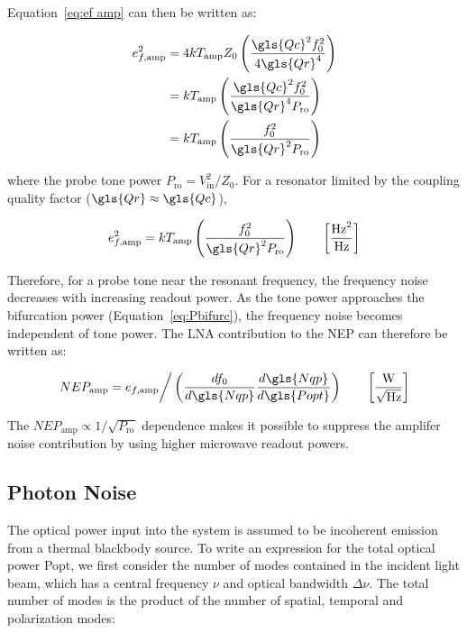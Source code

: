 Equation~\ref{eq:ef amp} can then be written as:

\begin{equation}
  \begin{aligned}
  e_{f,\mathrm{amp}}^{2} &= 4kT_{\mathrm{amp}}Z_{0}\left( \frac{\gls{Qc}^{2}f_{0}^{2}}{4\gls{Qr}^{4}} \right) \\
               &= kT_{\mathrm{amp}}\left( \frac{\gls{Qc}^{2}f_{0}^{2}}{\gls{Qr}^{4}P_{\mathrm{ro}}}\right) \\
               &= kT_{\mathrm{amp}}\left( \frac{f_{0}^{2}}{\gls{Qr}^{2}P_{\mathrm{ro}}}\right)
  \end{aligned}
\end{equation}

where the probe tone power $P_{\mathrm{ro}} = V_{\mathrm{in}}^{2}/Z_{0}$. For a resonator limited by the coupling quality factor ($\gls{Qr} \approx \gls{Qc}$),

\begin{equation}
  e_{f,\mathrm{amp}}^{2} = kT_{\mathrm{amp}}\left( \frac{f_{0}^{2}}{\gls{Qr}^{2}P_{\mathrm{ro}}}\right) \qquad \left[ \frac{\mathrm{Hz}^{2}}{\mathrm{Hz}} \right]
\end{equation}

Therefore, for a probe tone near the resonant frequency, the frequency noise decreases with increasing readout power. As the tone power approaches the bifurcation power (Equation~\ref{eq:Pbifurc}), the frequency noise becomes independent of tone power. The LNA contribution to the NEP can therefore be written as:

\begin{equation}\label{eq:NEP amp}
  NEP_{\mathrm{amp}} = e_{f,\mathrm{amp}} \bigg/ \left( \frac{df_{0}}{d\gls{Nqp}}\frac{d\gls{Nqp}}{d\gls{Popt}} \right) \qquad \left[ \frac{\mathrm{W}}{\sqrt{\mathrm{Hz}}} \right]
\end{equation}

The $NEP_{\mathrm{amp}} \propto 1/\sqrt{P_{\mathrm{ro}}} $ dependence makes it possible to suppress the amplifer noise contribution by using higher microwave readout powers.

\subsection{Photon Noise}\label{photon noise}

The optical power input into the system is assumed to be incoherent emission from a thermal blackbody source. To write an expression for the total optical power \gls{Popt}, we first consider the number of modes contained in the incident light beam, which has a central frequency $\nu$ and optical bandwidth $\Delta \nu$. The total number of modes is the product of the number of spatial, temporal and polarization modes:

